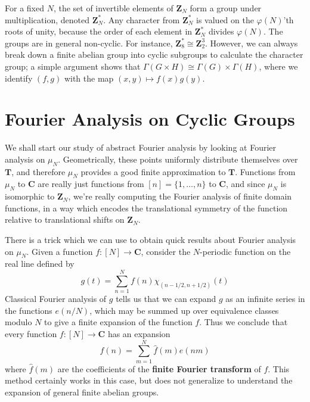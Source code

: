 \begin{example}
    For a fixed $N$, the set of invertible elements of $\mathbf{Z}_N$ form a group under multiplication, denoted $\mathbf{Z}_N^*$. Any character from $\mathbf{Z}_N^*$ is valued on the $\varphi(N)$'th roots of unity, because the order of each element in $\mathbf{Z}_N^*$ divides $\varphi(N)$. The groups are in general non-cyclic. For instance, $\mathbf{Z}_8^* \cong \mathbf{Z}_2^3$. However, we can always break down a finite abelian group into cyclic subgroups to calculate the character group; a simple argument shows that $\Gamma(G \times H) \cong \Gamma(G) \times \Gamma(H)$, where we identify $(f,g)$ with the map $(x,y) \mapsto f(x)g(y)$.
\end{example}

\section{Fourier Analysis on Cyclic Groups}

We shall start our study of abstract Fourier analysis by looking at Fourier analysis on $\mu_N$. Geometrically, these points uniformly distribute themselves over $\mathbf{T}$, and therefore $\mu_N$ provides a good finite approximation to $\mathbf{T}$. Functions from $\mu_N$ to $\mathbf{C}$ are really just functions from $[n] = \{ 1, \dots, n \}$ to $\mathbf{C}$, and since $\mu_N$ is isomorphic to $\mathbf{Z}_N$, we're really computing the Fourier analysis of finite domain functions, in a way which encodes the translational symmetry of the function relative to translational shifts on $\mathbf{Z}_N$.

There is a trick which we can use to obtain quick results about Fourier analysis on $\mu_N$. Given a function $f: [N] \to \mathbf{C}$, consider the $N$-periodic function on the real line defined by
%
\[ g(t) = \sum_{n = 1}^N f(n) \chi_{(n-1/2,n+1/2)}(t) \]
%
Classical Fourier analysis of $g$ tells us that we can expand $g$ as an infinite series in the functions $e(n/N)$, which may be summed up over equivalence classes modulo $N$ to give a finite expansion of the function $f$. Thus we conclude that every function $f: [N] \to \mathbf{C}$ has an expansion
%
\[ f(n) = \sum_{m = 1}^N \widehat{f}(m) e(nm) \]
%
where $\widehat{f}(m)$ are the coefficients of the {\bf finite Fourier transform} of $f$. This method certainly works in this case, but does not generalize to understand the expansion of general finite abelian groups.

